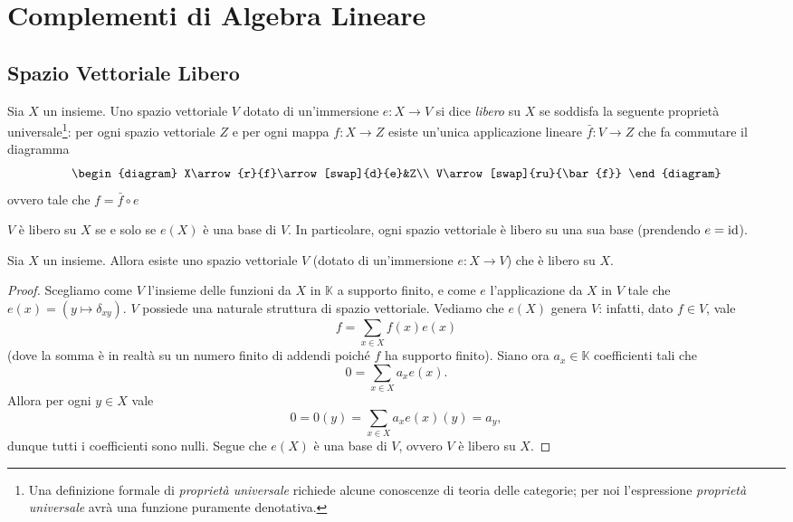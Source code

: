 \chapter{Complementi di Algebra Lineare}

\section{Spazio Vettoriale Libero}

\begin{definition}
Sia $X$ un insieme. Uno spazio vettoriale $V$ dotato di un'immersione $e:X\to V$ si dice \emph{libero} su $X$ se soddisfa la seguente proprietà universale\footnote{Una definizione formale di \emph{proprietà universale} richiede alcune conoscenze di teoria delle categorie; per noi l'espressione \emph{proprietà universale} avrà una funzione puramente denotativa.}: per ogni spazio vettoriale $Z$ e per ogni mappa $f:X\to Z$ esiste un'unica applicazione lineare $\bar{f}:V\to Z$ che fa commutare il diagramma
$$
\begin{diagram}
X\arrow{r}{f}\arrow[swap]{d}{e}&Z\\
V\arrow[swap]{ru}{\bar{f}}
\end{diagram}
$$
ovvero tale che $f=\bar{f}\circ e$
\end{definition}

\begin{remark}
$V$ è libero su $X$ se e solo se $e(X)$ è una base di $V$. In particolare, ogni spazio vettoriale è libero su una sua base (prendendo $e=\operatorname{id}$).
\end{remark}

\begin{proposition}
Sia $X$ un insieme. Allora esiste uno spazio vettoriale $V$ (dotato di un'immersione $e:X\to V$) che è libero su $X$.
\end{proposition}
\begin{proof}
Scegliamo come $V$ l'insieme delle funzioni da $X$ in $\mathbb{K}$ a supporto finito, e come $e$ l'applicazione da $X$ in $V$ tale che $e(x)=(y\mapsto\delta_{xy})$. $V$ possiede una naturale struttura di spazio vettoriale. Vediamo che $e(X)$ genera $V$: infatti, dato $f\in V$, vale
$$
f=\sum_{x\in X}f(x)e(x)
$$
(dove la somma è in realtà su un numero finito di addendi poiché $f$ ha supporto finito). Siano ora $a_x\in\mathbb{K}$ coefficienti tali che
$$
0=\sum_{x\in X}a_xe(x).
$$
Allora per ogni $y\in X$ vale
$$
0=0(y)=\sum_{x\in X}a_xe(x)(y)=a_y,
$$
dunque tutti i coefficienti sono nulli. Segue che $e(X)$ è una base di $V$, ovvero $V$ è libero su $X$.
\end{proof}


